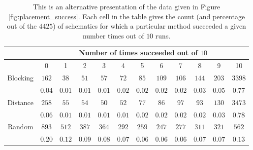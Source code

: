 \begin{table}[H]
\begin{center}
\begin{singlespace}
\begin{tabular}{|c||c|c|c|c|c|c|c|c|c|c|c|}
\hline
 & \multicolumn{11}{|c|}{Number of times succeeded out of $10$} \\
\hline
 & 0 & 1 & 2 & 3 & 4 & 5 & 6 & 7 & 8 & 9 & 10 \\
\hline\hline
Blocking & $162$ & $38$ & $51$ & $57$ & $72$ & $85$ & $109$ & $106$ & $144$ & $203$ & $3398$ \\
 & $0.04$ & $0.01$ & $0.01$ & $0.01$ & $0.02$ & $0.02$ & $0.02$ & $0.02$ & $0.03$ & $0.05$ & $0.77$ \\
\hline
 Distance & $258$ & $55$ & $54$ & $50$ & $52$ & $77$ & $86$ & $97$ & $93$ & $130$ & $3473$ \\
  & $0.06$ & $0.01$ & $0.01$ & $0.01$ & $0.01$ & $0.02$ & $0.02$ & $0.02$ & $0.02$ & $0.03$ & $0.78$ \\
\hline
  Random & $893$ & $512$ & $387$ & $364$ & $292$ & $259$ & $247$ & $277$ & $311$ & $321$ & $562$ \\
   & $0.20$ & $0.12$ & $0.09$ & $0.08$ & $0.07$ & $0.06$ & $0.06$ & $0.06$ & $0.07$ & $0.07$ & $0.13$ \\
\hline
\end{tabular}
\end{singlespace}
\end{center}
\label{tb:placement_success}
\caption[Placement method success rate comparison]{This is an alternative
presentation of the data given in Figure \ref{fig:placement_success}. Each cell
in the table gives the count (and percentage out of the $4425$)
of schematics for which a
particular method succeeded a given number times out of $10$ runs.}
\end{table}

